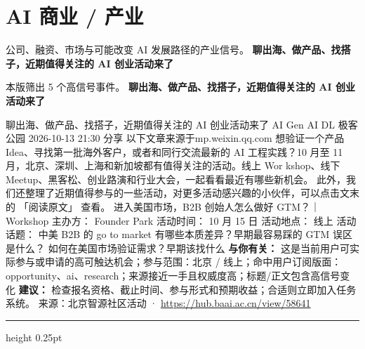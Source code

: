 \documentclass[10.5pt]{ctexart}
\begin{document}
\section*{AI 商业 / 产业}
{\color{ormuted} 公司、融资、市场与可能改变 AI 发展路径的产业信号。}
\vspace{2mm}
{\LARGE\bfseries 聊出海、做产品、找搭子，近期值得关注的 AI 创业活动来了}\par
\vspace{1mm}
{\color{ormuted} 本版筛出 5 个高信号事件。}
\vspace{3mm}
{\Large\bfseries 聊出海、做产品、找搭子，近期值得关注的 AI 创业活动来了}\par
聊出海、做产品、找搭子，近期值得关注的 AI 创业活动来了 AI Gen AI DL 极客公园 2026-10-13 21:30 分享 以下文章来源于mp.weixin.qq.com 想验证一个产品 Idea、寻找第一批海外客户，或者和同行交流最新的 AI 工程实践？10 月至 11 月，北京、深圳、上海和新加坡都有值得关注的活动。线上 Wor kshop、线下 Meetup、黑客松、创业路演和行业大会，一起看看最近有哪些新机会。 此外，我们还整理了近期值得参与的一些活动，对更多活动感兴趣的小伙伴，可以点击文末的 「阅读原文」 查看。 进入美国市场，B2B 创始人怎么做好 GTM？｜Workshop 主办方： Founder Park 活动时间： 10 月 15 日 活动地点： 线上 活动话题： 中美 B2B 的 go to market 有哪些本质差异？早期最容易踩的 GTM 误区是什么？ 如何在美国市场验证需求？早期该找什么
\textbf{与你有关：} 这是当前用户可实际参与或申请的高可触达机会；参与范围：北京 / 线上；命中用户订阅版面：opportunity、ai、research；来源接近一手且权威度高；标题/正文包含高信号变化
\textbf{建议：} 检查报名资格、截止时间、参与形式和预期收益；合适则立即加入任务系统。
{\footnotesize\color{ormuted} 来源：北京智源社区活动 · \url{https://hub.baai.ac.cn/view/58641}}
\vspace{4mm}
\hrule height 0.25pt
\vspace{3mm}
\end{document}
